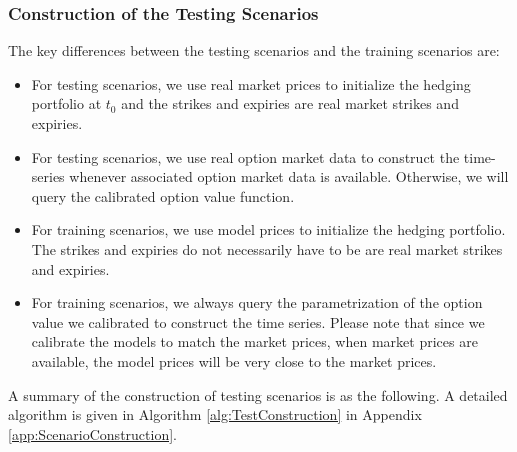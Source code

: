 \documentclass[letterpaper,12pt,titlepage,oneside,final]{book}
\numberwithin{equation}{section}
\theoremstyle{definition}
\begin{document}
\subsubsection{Construction of the Testing Scenarios}
\label{sec:AugTest}
The key differences between the testing scenarios and the training scenarios are:
\begin{itemize}
	\item  For testing scenarios, we use real market prices to initialize the hedging portfolio at $t_0$ and the strikes and expiries are real market strikes and expiries.
	\item  For testing scenarios, we use real option market data to construct the time-series whenever associated  option market data is available. Otherwise, we will query the calibrated option value function.
	\item For training scenarios, we use model prices to initialize the hedging portfolio. The strikes and expiries do not necessarily have to be are real market strikes and expiries.
	\item   For training scenarios, we always query the parametrization of the option value we calibrated to construct  the time series. Please note that  since we calibrate the models to match the market prices, when market prices are available, the model prices will be very close to the market prices. 
\end{itemize}
A summary of the construction of testing scenarios is as the following. A detailed algorithm is given in Algorithm \ref{alg:TestConstruction} in Appendix \ref{app:ScenarioConstruction}.
\end{document}
